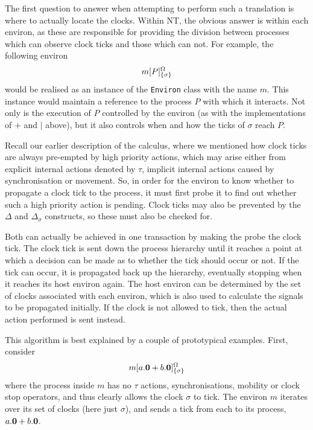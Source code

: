 The first question to answer when attempting to perform such a
translation is where to actually locate the clocks.  Within NT, the
obvious answer is within each environ, as these are responsible for
providing the division between processes which can observe clock ticks
and those which can not.  For example, the following environ
\begin{displaymath}
{m}[ P ]^{\Omega}_{\{\sigma\}}
\end{displaymath}
would be realised as an instance of the \texttt{Environ} class with the
name $m$.  This instance would maintain a reference to the process $P$
with which it interacts.  Not only is the execution of $P$ controlled by
the environ (as with the implementations of $+$ and $\mid$ above), but
it also controls when and how the ticks of $\sigma$ reach $P$.

Recall our earlier description of the calculus, where we mentioned how
clock ticks are always pre-empted by high priority actions, which may
arise either from explicit internal actions denoted by $\tau$, implicit
internal actions caused by synchronisation or movement.  So, in order
for the environ to know whether to propagate a clock tick to the
process, it must first probe it to find out whether such a high priority
action is pending.  Clock ticks may also be prevented by the $\Delta$
and $\Delta_\sigma$ constructs, so these must also be checked for.

Both can actually be achieved in one transaction by making the probe the
clock tick.  The clock tick is sent down the process hierarchy until it
reaches a point at which a decision can be made as to whether the tick
should occur or not.  If the tick can occur, it is propagated back up
the hierarchy, eventually stopping when it reaches its host environ
again.  The host environ can be determined by the set of clocks
associated with each environ, which is also used to calculate the
signals to be propagated initially.  If the clock is not allowed to
tick, then the actual action performed is sent instead.

This algorithm is best explained by a couple of prototypical examples.
First, consider 
\begin{displaymath}
{m}[ a.\textbf{0} + b.\textbf{0} ]^{\Omega}_{\{\sigma\}}
\end{displaymath}
where the process inside $m$ has no $\tau$ actions, synchronisations,
mobility or clock stop operators, and thus clearly allows the clock
$\sigma$ to tick.  The environ $m$ iterates over its set of clocks (here
just $\sigma$), and sends a tick from each to its process, $a.\textbf{0} +
b.\textbf{0}$.

